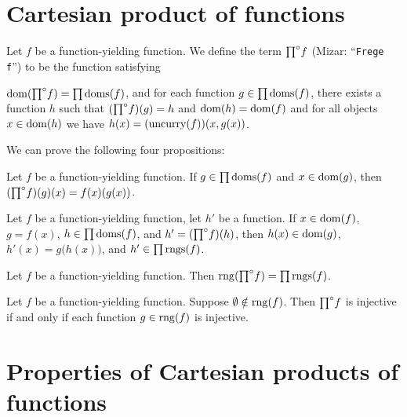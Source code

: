 \documentclass{article}
\begin{document}
\section{Cartesian product of functions}

\begin{definition}
Let $f$ be a function-yielding function.
We define the term ${\prod}^{\circ}f$ (Mizar: ``\verb#Frege f#'') to be the
function satisfying
\begin{defn}
\item $\operatorname{dom}({\prod}^{\circ}f)=\prod\operatorname{doms}(f)$, and for each function $g\in\prod\operatorname{doms}(f)$,
  there exists a function $h$ such that $({\prod}^{\circ}f)(g)=h$ and
  $\operatorname{dom}(h)=\operatorname{dom}(f)$ and for all objects $x\in\operatorname{dom}(h)$ we have $h(x)=(\operatorname{uncurry}(f))(x,g(x))$.
\end{defn}
\end{definition}

We can prove the following four propositions:
\begin{thm}
\item\label{funct6:36} Let $f$ be a function-yielding function. If
  $g\in\prod\operatorname{doms}(f)$ and $x\in\operatorname{dom}(g)$, then $({\prod}^{\circ}f)(g)(x)=f(x)(g(x))$.
\item\label{funct6:37} Let $f$ be a function-yielding function, let $h'$
  be a function.
  If $x\in\operatorname{dom}(f)$, $g=f(x)$, $h\in\prod\operatorname{doms}(f)$, and $h'=({\prod}^{\circ}f)(h)$,
  then $h(x)\in\operatorname{dom}(g)$, $h'(x)=g\bigl(h(x)\bigr)$, and $h'\in\prod\operatorname{rngs}(f)$.
\item\label{funct6:38} Let $f$ be a function-yielding function.
  Then $\operatorname{rng}({\prod}^{\circ}f)=\prod\operatorname{rngs}(f)$.
\item\label{funct6:39} Let $f$ be a function-yielding function.
  Suppose $\emptyset\notin\operatorname{rng}(f)$.
  Then ${\prod}^{\circ}f$ is injective if and only if each function
  $g\in\operatorname{rng}(f)$ is injective.
\end{thm}

\section{Properties of Cartesian products of functions}
\end{document}
